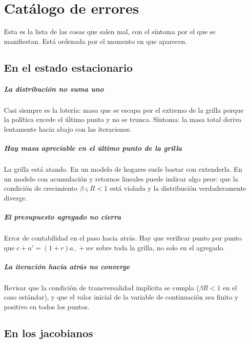 \chapter{Catálogo de errores}
\label{ap:errores}

Esta es la lista de las cosas que salen mal, con el síntoma por el que se
manifiestan. Está ordenada por el momento en que aparecen.

\section{En el estado estacionario}

\paragraph{La distribución no suma uno} Casi siempre es la lotería: masa que se
escapa por el extremo de la grilla porque la política excede el último punto y no
se trunca. Síntoma: la masa total deriva lentamente hacia abajo con las
iteraciones.

\paragraph{Hay masa apreciable en el último punto de la grilla} La grilla está
atando. En un modelo de hogares suele bastar con extenderla. En un modelo con
acumulación y retornos lineales puede indicar algo peor: que la condición de
crecimiento $\beta\varsigma R<1$ está violada y la distribución verdaderamente
diverge.

\paragraph{El presupuesto agregado no cierra} Error de contabilidad en el paso
hacia atrás. Hay que verificar punto por punto que
$c + a' = (1+r)a_- + we$ sobre toda la grilla, no solo en el agregado.

\paragraph{La iteración hacia atrás no converge} Revisar que la condición de
transversalidad implícita se cumpla ($\beta R<1$ en el caso estándar), y que el
valor inicial de la variable de continuación sea finito y positivo en todos los
puntos.

\section{En los jacobianos}

